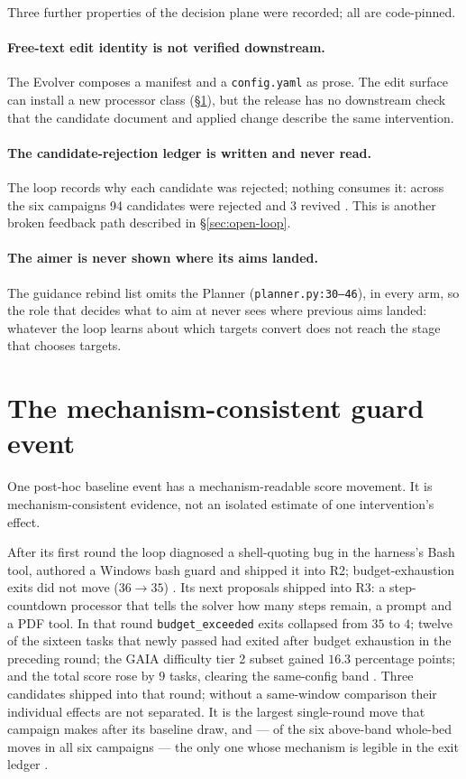 Three further properties of the decision plane were recorded; all are
code-pinned.

\paragraph{Free-text edit identity is not verified downstream.} The Evolver
composes a manifest and a \texttt{config.yaml} as prose. The edit surface can
install a new processor class (\S\ref{sec:one-repair}), but the release has
no downstream check that the candidate document and applied change describe
the same intervention.

\paragraph{The candidate-rejection ledger is written and never read.} The loop
records why each candidate was rejected; nothing consumes it: across the six
campaigns 94 candidates were rejected and 3 revived . This is another broken feedback path described in
\S\ref{sec:open-loop}.

\paragraph{The aimer is never shown where its aims landed.} The guidance
rebind list omits the Planner (\texttt{planner.py:30--46}), in every arm,
so the role that decides what to aim at never sees where previous aims
landed: whatever the loop learns about which targets convert does not reach
the stage that chooses targets.

\section{The mechanism-consistent guard event}
\label{sec:one-repair}

One post-hoc baseline event has a mechanism-readable score movement. It is
mechanism-consistent evidence, not an isolated estimate of one intervention's
effect.

After its first round the loop diagnosed a shell-quoting bug in the
harness's Bash tool, authored a Windows bash guard and shipped it into R2;
budget-exhaustion exits did not move ($36 \to 35$) . Its next proposals
shipped into R3: a step-countdown processor that tells the solver how many
steps remain, a prompt and a PDF tool. In that round
\texttt{budget\_exceeded} exits collapsed from $35$ to $4$; twelve of the
sixteen tasks that newly passed had exited after budget exhaustion in the
preceding round; the GAIA difficulty tier 2 subset gained $16.3$ percentage
points; and the total score rose by $9$ tasks, clearing the same-config band
. Three candidates shipped into that round; without a same-window
comparison their individual effects are not separated. It is the largest
single-round move that campaign makes after its baseline draw, and --- of
the six above-band whole-bed moves in all six campaigns --- the only one
whose mechanism is legible in the exit ledger .

